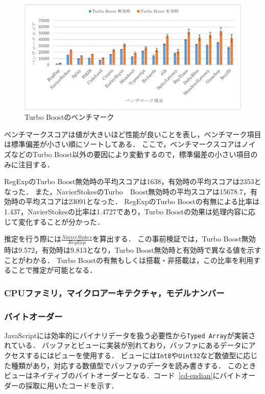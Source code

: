 \begin{figure}[H]
	\centering
    \includegraphics[width=\textwidth,pagebox=artbox]{fig/turbo_boost.png}
    \caption{Turbo Boostのベンチマーク}
    \label{fig-turbo_boost}
\end{figure}

ベンチマークスコアは値が大きいほど性能が良いことを表し，ベンチマーク項目は標準偏差が小さい順にソートしてある．
ここで，ベンチマークスコアはノイズなどのTurbo Boost以外の要因により変動するので，標準偏差の小さい項目のみに注目する．

RegExpのTurbo Boost無効時の平均スコアは1638，有効時の平均スコアは2353となった．
また，NavierStokesのTurbo　Boost無効時の平均スコアは15678.7，有効時の平均スコアは23091となった．
RegExpのTurbo Boostの有無による比率は1.437，NavierStokesの比率は1.4727であり，Turbo Boostの効果は処理内容に応じて変化することが分かった．

推定を行う際には$\frac{NavierStokes}{RegExp}$を算出する．
この事前検証では，Turbo Boost無効時は9.572，有効時は9.813となり，Turbo Boost無効時と有効時で異なる値を示すことがわかる．
Turbo Boostの有無もしくは搭載・非搭載は，この比率を利用することで推定が可能となる．

\subsubsection{CPUファミリ，マイクロアーキテクチャ，モデルナンバー}


\subsubsection{バイトオーダー}
JavaScriptには効率的にバイナリデータを扱う必要性から\texttt{Typed Array}が実装されている．
バッファとビューに実装が別れており，バッファにあるデータにアクセスするにはビューを使用する．
ビューには\texttt{Int8}や\texttt{Uint32}など数値型に応じた種類があり，対応する数値型でバッファのデータを読み書きする．
このときビューはネイティブのバイトオーダーとなる．コード~\ref{cd-endian}にバイトオーダーの採取に用いたコードを示す．

